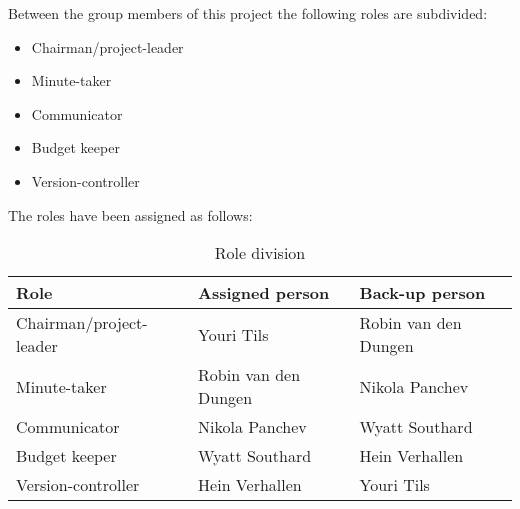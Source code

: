 Between the group members of this project the following roles are subdivided:
\begin{itemize}
    \setlength\itemsep{-0.3em}
    \item Chairman/project-leader
    \item Minute-taker
    \item Communicator
    \item Budget keeper
    \item Version-controller
\end{itemize}

The roles have been assigned as follows:
\begin{table}[!h]
    \begin{tabular}{|l|l|l|}
        \hline
        \textbf{Role}           & \textbf{Assigned person}  & \textbf{Back-up person} \\ \hline
        Chairman/project-leader & Youri Tils                & Robin van den Dungen    \\ \hline
        Minute-taker            & Robin van den Dungen      & Nikola Panchev          \\ \hline
        Communicator            & Nikola Panchev            & Wyatt Southard          \\ \hline
        Budget keeper           & Wyatt Southard            & Hein Verhallen          \\ \hline
        Version-controller      & Hein Verhallen            & Youri Tils              \\ \hline
    \end{tabular}
    \caption{Role division}
\end{table}